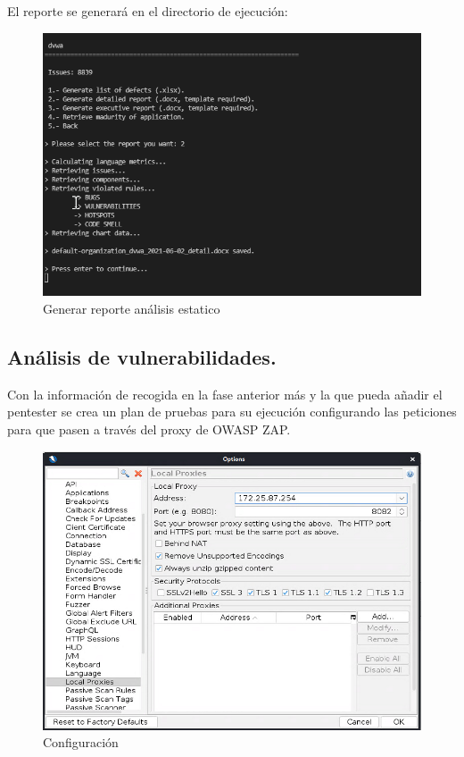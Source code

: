 El reporte se generará en el directorio de ejecución:

\begin{figure}[h!] 
    \captionsetup{width=1\linewidth}   
    \includegraphics[width=\linewidth]{./imagenes/017_SonarQubeReportTool_4.png}
    \caption{Generar reporte análisis estatico}  
    \label{fig:18}
\end{figure}
\clearpage
\newpage

\subsection{Análisis de vulnerabilidades.}
Con la información de recogida en la fase anterior más y la que pueda añadir el pentester se crea un plan de pruebas 
para su ejecución configurando las peticiones para que pasen a través del proxy de OWASP ZAP.

\begin{figure}[h!]
    \captionsetup{width=1\linewidth}  
    \includegraphics[width=\linewidth]{./imagenes/031_OWASPZAP_LocalProxy.png}
    \caption{Configuración}  
    \label{fig:localProxyOWASPZap}
\end{figure}

